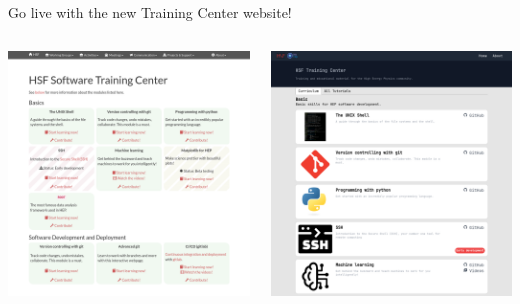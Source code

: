\documentclass[aspectratio=169]{beamer}
\begin{document}
\begin{frame}{Go live with the new Training Center website!}
\vspace{0.25 cm}
\begin{columns}
\includegraphics[width=\linewidth]{old-website.png}

\includegraphics[width=\linewidth]{new-website.png}
\end{columns}
\end{frame}
\end{document}
